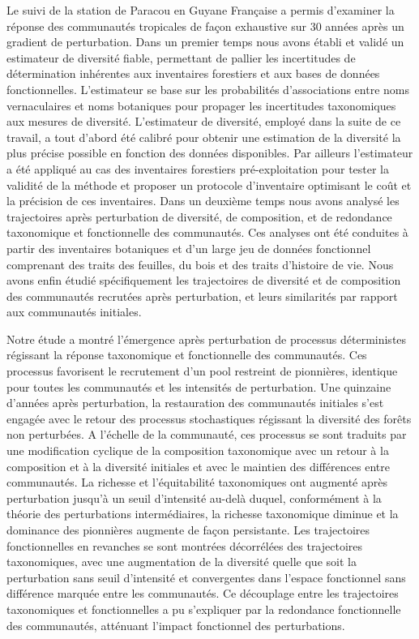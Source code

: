 \documentclass[
  11pt,
  french,
  A4paper,
  extrafontsizes,onecolumn,openright
  ]{memoir}
\begin{document}
\begin{normalsize}
\begin{description}
Le suivi de la station de Paracou en Guyane Française a permis
d'examiner la réponse des communautés tropicales de façon exhaustive sur
30 années après un gradient de perturbation. Dans un premier temps nous
avons établi et validé un estimateur de diversité fiable, permettant de
pallier les incertitudes de détermination inhérentes aux inventaires
forestiers et aux bases de données fonctionnelles. L'estimateur se base
sur les probabilités d'associations entre noms vernaculaires et noms
botaniques pour propager les incertitudes taxonomiques aux mesures de
diversité. L'estimateur de diversité, employé dans la suite de ce
travail, a tout d'abord été calibré pour obtenir une estimation de la
diversité la plus précise possible en fonction des données disponibles.
Par ailleurs l'estimateur a été appliqué au cas des inventaires
forestiers pré-exploitation pour tester la validité de la méthode et
proposer un protocole d'inventaire optimisant le coût et la précision de
ces inventaires. Dans un deuxième temps nous avons analysé les
trajectoires après perturbation de diversité, de composition, et de
redondance taxonomique et fonctionnelle des communautés. Ces analyses
ont été conduites à partir des inventaires botaniques et d'un large jeu
de données fonctionnel comprenant des traits des feuilles, du bois et
des traits d'histoire de vie. Nous avons enfin étudié spécifiquement les
trajectoires de diversité et de composition des communautés recrutées
après perturbation, et leurs similarités par rapport aux communautés
initiales.

Notre étude a montré l'émergence après perturbation de processus
déterministes régissant la réponse taxonomique et fonctionnelle des
communautés. Ces processus favorisent le recrutement d'un pool restreint
de pionnières, identique pour toutes les communautés et les intensités
de perturbation. Une quinzaine d'années après perturbation, la
restauration des communautés initiales s'est engagée avec le retour des
processus stochastiques régissant la diversité des forêts non
perturbées. A l'échelle de la communauté, ces processus se sont traduits
par une modification cyclique de la composition taxonomique avec un
retour à la composition et à la diversité initiales et avec le maintien
des différences entre communautés. La richesse et l'équitabilité
taxonomiques ont augmenté après perturbation jusqu'à un seuil
d'intensité au-delà duquel, conformément à la théorie des perturbations
intermédiaires, la richesse taxonomique diminue et la dominance des
pionnières augmente de façon persistante. Les trajectoires
fonctionnelles en revanches se sont montrées décorrélées des
trajectoires taxonomiques, avec une augmentation de la diversité quelle
que soit la perturbation sans seuil d'intensité et convergentes dans
l'espace fonctionnel sans différence marquée entre les communautés. Ce
découplage entre les trajectoires taxonomiques et fonctionnelles a pu
s'expliquer par la redondance fonctionnelle des communautés, atténuant
l'impact fonctionnel des perturbations.


\end{description}
\end{normalsize}
\end{document}
